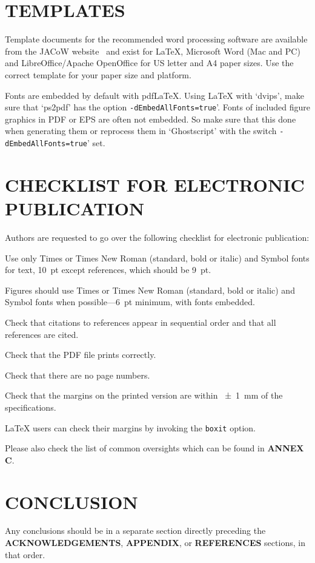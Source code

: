 \section{TEMPLATES}

Template documents for the recommended word processing
software are available from the JACoW website~\cite{jacow-help}
and exist for \LaTeX, Microsoft Word (Mac and PC)
and LibreOffice/Apache OpenOffice for US letter and A4
paper sizes. Use the correct template for your paper size and
platform.

Fonts are embedded by default with pdf\LaTeX. Using \LaTeX{} with `dvips', 
make sure that `ps2pdf' has the option \texttt{-dEmbedAllFonts=true}'.
Fonts of included figure graphics in PDF or EPS are often not embedded. 
So make sure that this done when generating them or reprocess them 
in `Ghostscript' with the switch \texttt{-dEmbedAllFonts=true}' set.

\flushcolsend

\section{CHECKLIST FOR ELECTRONIC PUBLICATION}
Authors are requested to go over the following checklist for electronic publication:
\begin{Itemize}
	\item  Use only Times or Times New Roman (standard, bold or italic) and Symbol
	fonts for text, \SI{10}{pt} except references, which should be \SI{9}{pt}.
	
	\item  Figures should use Times or Times New Roman (standard, bold or italic) and
	Symbol fonts when possible---\SI{6}{pt} minimum, with fonts embedded.
	\item  Check that citations to references appear in sequential order and
	that all references are cited.
	\item  Check that the PDF file prints correctly.
	\item  Check that there are no page numbers.
	\item  Check that the margins on the printed version are within \SI{\pm1}{mm}
	of the specifications.
	\item  \LaTeX{} users can check their margins by invoking the
	\texttt{boxit} option.
\end{Itemize}

Please also check the list of common oversights which can be found in \textbf{ANNEX C}.

\section{CONCLUSION}
Any conclusions should be in a separate section directly preceding
the \textbf{ACKNOWLEDGEMENTS}, \textbf{APPENDIX}, or \textbf{REFERENCES} sections, in that
order.




%
% 




